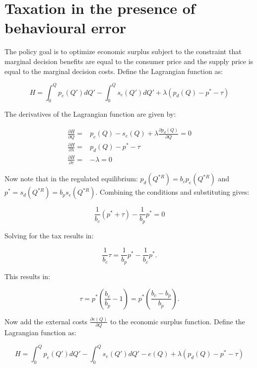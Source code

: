 \documentclass[
]{book}
\begin{document}
\hypertarget{apperror}{%
\chapter{Taxation in the presence of behavioural error}\label{apperror}}

The policy goal is to optimize economic surplus subject to the constraint that marginal decision benefits are equal to the consumer price and the supply price is equal to the marginal decision costs. Define the Lagrangian function as:

\begin{equation}
H = \int_0^Q p_e (Q')dQ' - \int^Q_0 s_e(Q')dQ' + \lambda (p_d(Q) - p^* - \tau)
\end{equation}

The derivatives of the Lagrangian function are given by:

\begin{align}
  \frac{\partial H}{\partial Q} =& p_e(Q) - s_e(Q) + \lambda \frac{\partial p_d(Q)}{\partial Q} = 0 \\
  \frac{\partial H}{\partial \lambda} =& p_d (Q) - p^* - \tau \\
  \frac{\partial H}{\partial \tau} =& -\lambda  =0
\end{align}

Now note that in the regulated equilibrium: \(p_d (Q^{*R} )=b_c p_e (Q^{*R} )\) and \(p^*=s_d (Q^{*R}) =b_p s_e (Q^{*R})\). Combining the conditions and substituting gives:

\begin{equation}
\frac{1}{b_c} (p^* + \tau) - \frac{1}{b_p}p^* = 0
\end{equation}

Solving for the tax results in:

\begin{equation}
\frac{1}{b_c} \tau = \frac{1}{b_p} p^* - \frac{1}{b_c} p^*.
\end{equation}

This results in:

\begin{equation}
\tau = p^* \left(\frac{b_c}{b_p} - 1 \right) = p^* \left(\frac{b_c - b_p}{b_p}\right).
\end{equation}

Now add the external costs \(\frac{\partial e(Q)}{\partial Q}\) to the economic surplus function. Define the Lagrangian function as:

\begin{equation}
H = \int_0^Q p_e (Q')dQ' - \int^Q_0 s_e(Q')dQ' - e(Q) + \lambda (p_d(Q) - p^* - \tau)
\end{equation}
\end{document}
